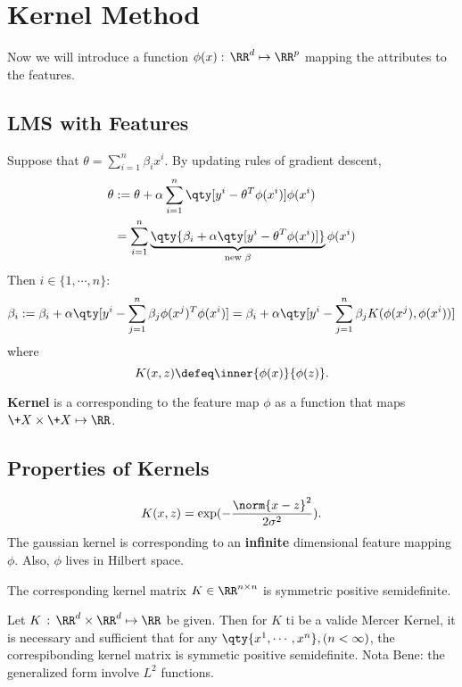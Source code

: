 \section{Kernel Method}
Now we will introduce a function $\phi(x):\,\RR^d\mapsto \RR^p$ mapping the attributes to the features.
\subsection{LMS with Features}
Suppose that $\theta=\sum_{i=1}^n\beta_ix^i$. By updating rules of gradient descent,
\[
	\begin{aligned}
		\theta&:=
		\theta+\alpha\sum_{i=1}^n\qty[y^i-\theta^T\phi(x^i)]\phi(x^i)
		\\&=
		\sum_{i=1}^n\underbrace{\qty{\beta_i+\alpha\qty[y^i-\theta^T\phi(x^i)]}}_{\text{new }\beta}\phi(x^i)
	\end{aligned}
\] Then $i\in\{1,\cdots,n\}$:
\[
	\beta_i:=\beta_i+\alpha\qty[y^i-\sum_{j=1}^n\beta_j\phi(x^j)^T\phi(x^i)]
	=\beta_i+\alpha\qty[y^i-\sum_{j=1}^n\beta_jK(\phi(x^j),\phi(x^i))]
\] where
\[
	K(x,z)\defeq \inner{\phi(x)}{\phi(z)}
.\] 
\begin{remark}
	\textbf{Kernel} is a corresponding to the feature map $\phi$ as a function that maps $\+X\times\+X\mapsto \RR$.
\end{remark}

\subsection{Properties of Kernels}
\begin{defi}
	\[
		K(x,z)=\exp(-\frac{\norm{x-z}^2}{2\sigma^2})
	.\] 
	The gaussian kernel is corresponding to an \textbf{infinite} dimensional feature mapping $\phi$. Also, $\phi$ lives in Hilbert space.
\end{defi}

\begin{thm}
	The corresponding kernel matrix $K\in \RR^{n\times n}$ is symmetric positive semidefinite.
\end{thm}

\begin{thm}
	Let $K\,:\,\RR^d\times\RR^d\mapsto \RR$ be given. 
	Then for $K$ ti be a valide Mercer Kernel, it is necessary and sufficient that for any $\qty{x^{1},\cdots,x^{n}},(n<\infty)$, the correspibonding kernel matrix is symmetic positive semidefinite.
	Nota Bene: the generalized form involve $L^2$ functions.
\end{thm}
